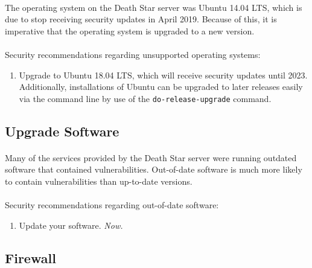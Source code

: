 \documentclass{article}
\begin{document}
\paragraph{}
The operating system on the Death Star server was Ubuntu 14.04 LTS, which is due to stop receiving security updates in April 2019.
Because of this, it is imperative that the operating system is upgraded to a new version.

\paragraph{}
\begin{adjustwidth}{1.5cm}{1.5cm}
	Security recommendations regarding unsupported operating systems:
	\begin{enumerate}
		\item Upgrade to Ubuntu 18.04 LTS, which will receive security updates until 2023. Additionally, installations of Ubuntu can be upgraded to later releases easily via the command line by use of the \texttt{do-release-upgrade} command.
	\end{enumerate}
\end{adjustwidth}

\subsection{Upgrade Software}
\label{subsec:upgrade_software}
\paragraph{}
Many of the services provided by the Death Star server were running outdated software that contained vulnerabilities.
Out-of-date software is much more likely to contain vulnerabilities than up-to-date versions.

\paragraph{}
\begin{adjustwidth}{1.5cm}{1.5cm}
	Security recommendations regarding out-of-date software:
	\begin{enumerate}
		\item Update your software. \emph{Now.}
	\end{enumerate}
\end{adjustwidth}

\subsection{Firewall}
\label{subsec:firewall}
\end{document}
